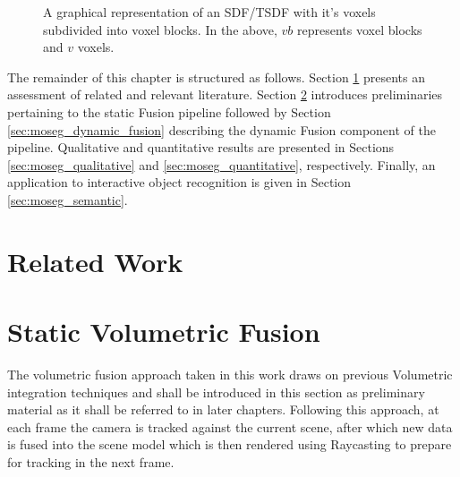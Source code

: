 \begin{figure}[h]
{
  }
  \caption[TSDF split in to voxel blocks]{A graphical representation of an 
  SDF/TSDF with it's voxels subdivided into voxel blocks. In the above, $vb$ 
  represents voxel blocks and $v$ voxels.}
\end{figure}

The remainder of this chapter is structured as follows.
Section \ref{sec:moseg_related_work} presents an assessment of related and
relevant literature. Section \ref{sec:moseg_static_fusion} introduces
preliminaries pertaining to the static Fusion pipeline followed by Section
\ref{sec:moseg_dynamic_fusion} describing the dynamic Fusion component of the
pipeline. Qualitative and quantitative results are presented in Sections
\ref{sec:moseg_qualitative} and \ref{sec:moseg_quantitative}, respectively.
Finally, an application to interactive object recognition is given in Section
\ref{sec:moseg_semantic}.

\section{Related Work}
\label{sec:moseg_related_work}

\section{Static Volumetric Fusion}
\label{sec:moseg_static_fusion}
The volumetric fusion approach taken in this work draws on previous Volumetric
integration techniques \cite{Curless1996, Newcombe2011, NieBner2013, Prisacariu2014} 
and shall be introduced in this section as preliminary material as it shall be
referred to in later chapters. Following this approach, at each frame the camera
is tracked against the current scene, after which new data is fused into the
scene model which is then rendered using Raycasting to prepare for tracking in
the next frame.

